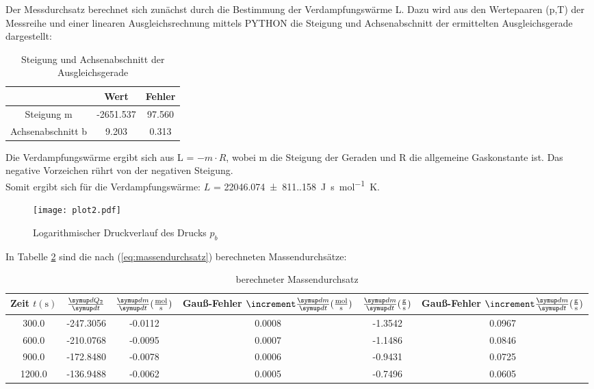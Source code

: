{{Der Messdurchsatz berechnet sich zunächst durch die Bestimmung der Verdampfungswärme L.
Dazu wird aus den Wertepaaren (p,T) der Messreihe und einer linearen Ausgleichsrechnung mittels PYTHON die 
Steigung und Achsenabschnitt der ermittelten Ausgleichsgerade dargestellt: 

\begin{table}
  \centering
  \caption{Steigung und Achsenabschnitt der Ausgleichsgerade}
  \label{tab:güteziffern_t1}
  \begin{tabular}{c c c}
    \toprule
    {} &         Wert &      Fehler \\
    \midrule
    Steigung m        & -2651.537 &  97.560 \\
    Achsenabschnitt b &     9.203 &   0.313 \\
    \bottomrule
  \end{tabular}
\end{table} 

Die Verdampfungswärme ergibt sich aus L = $-m \cdot R$, wobei m die Steigung der Geraden und R die 
allgemeine Gaskonstante ist. Das negative Vorzeichen rührt von der negativen Steigung. 
\\

Somit ergibt sich für die Verdampfungswärme:
$L$ = \qty{22046.074(811.158)}{\unit[per-mode=fraction]{\joule\second\per\mol\kelvin}}.

\begin{figure}
  \centering
  \texttt{[image: plot2.pdf]}
  \caption{Logarithmischer Druckverlauf des Drucks $p_{b}$}
  \label{fig:plot2}
\end{figure}

In Tabelle \ref{tb:massendurchsaetze} sind die nach (\ref{eq:massendurchsatz}) berechneten Massendurchsätze:

\begin{table} 
  \centering
  \caption{berechneter Massendurchsatz}
  \label{tb:massendurchsaetze}
  \begin{tabular}{c c c c c c}
    \toprule
    {Zeit $t (\unit{\second})$} &
    {$\frac {\dif{Q_{2}}} {\dif{t}}$} &
    {$\frac {\dif{m}} {\dif{t}} (\unit[per-mode=fraction]{\mol\per\second})$} &
    {Gauß-Fehler $\increment \frac {\dif{m}} {\dif{t}} (\unit[per-mode=fraction]{\mol\per\second})$} &
    {$\frac{\dif{m}} {\dif{t}} (\unit[per-mode=fraction]{\gram\per\second})$} &
    {Gauß-Fehler $\increment \frac {\dif{m}} {\dif{t}} (\unit[per-mode=fraction]{\gram\per\second})$} \\
    \midrule
     300.0 & -247.3056 &        -0.0112 &          0.0008 &      -1.3542 &        0.0967 \\
     600.0 & -210.0768 &        -0.0095 &          0.0007 &      -1.1486 &        0.0846 \\
     900.0 & -172.8480 &        -0.0078 &          0.0006 &      -0.9431 &        0.0725 \\
    1200.0 & -136.9488 &        -0.0062 &          0.0005 &      -0.7496 &        0.0605 \\
    \bottomrule
\end{tabular}
\end{table}

}}

